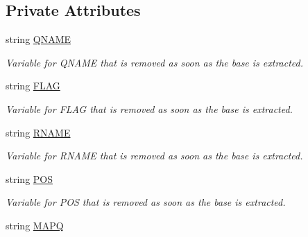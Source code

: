 \subsection*{Private Attributes}
\begin{DoxyCompactItemize}
\item 
\hypertarget{class_input_s_e_q_a123b9b6960b953f33a9e4b31647b5643}{string \hyperlink{class_input_s_e_q_a123b9b6960b953f33a9e4b31647b5643}{Q\+N\+A\+M\+E}}\label{class_input_s_e_q_a123b9b6960b953f33a9e4b31647b5643}

\begin{DoxyCompactList}\small\item\em Variable for Q\+N\+A\+M\+E that is removed as soon as the base is extracted. \end{DoxyCompactList}\item 
\hypertarget{class_input_s_e_q_a88af1c310a8b38e97d38d931a729316a}{string \hyperlink{class_input_s_e_q_a88af1c310a8b38e97d38d931a729316a}{F\+L\+A\+G}}\label{class_input_s_e_q_a88af1c310a8b38e97d38d931a729316a}

\begin{DoxyCompactList}\small\item\em Variable for F\+L\+A\+G that is removed as soon as the base is extracted. \end{DoxyCompactList}\item 
\hypertarget{class_input_s_e_q_ac04f1790d5d8c51b18ee51562cdcb2d9}{string \hyperlink{class_input_s_e_q_ac04f1790d5d8c51b18ee51562cdcb2d9}{R\+N\+A\+M\+E}}\label{class_input_s_e_q_ac04f1790d5d8c51b18ee51562cdcb2d9}

\begin{DoxyCompactList}\small\item\em Variable for R\+N\+A\+M\+E that is removed as soon as the base is extracted. \end{DoxyCompactList}\item 
\hypertarget{class_input_s_e_q_a20b5d2aefb4507a7dcad1dba350cf9b2}{string \hyperlink{class_input_s_e_q_a20b5d2aefb4507a7dcad1dba350cf9b2}{P\+O\+S}}\label{class_input_s_e_q_a20b5d2aefb4507a7dcad1dba350cf9b2}

\begin{DoxyCompactList}\small\item\em Variable for P\+O\+S that is removed as soon as the base is extracted. \end{DoxyCompactList}\item 
\hypertarget{class_input_s_e_q_ae65a6c8ac95a3156f612606022b53697}{string \hyperlink{class_input_s_e_q_ae65a6c8ac95a3156f612606022b53697}{M\+A\+P\+Q}}\label{class_input_s_e_q_ae65a6c8ac95a3156f612606022b53697}


\end{DoxyCompactItemize}
